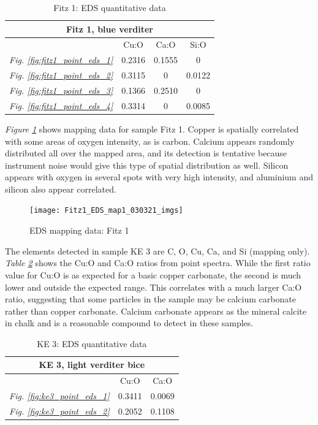 \begin{table}[H]
\caption{Fitz 1: EDS quantitative data}
\centering
\label{table:fitz1_ratios}
\begin{tabular}{c c c c}
\toprule
\multicolumn{4}{c}{Fitz 1, blue verditer} \\
\midrule
~ & Cu:O & Ca:O & Si:O \\
\midrule
\textit{Fig. \ref{fig:fitz1_point_eds_1}} & 0.2316 & 0.1555 & 0 \\
\textit{Fig. \ref{fig:fitz1_point_eds_2}} & 0.3115 & 0 & 0.0122 \\
\textit{Fig. \ref{fig:fitz1_point_eds_3}} & 0.1366 & 0.2510 & 0 \\
\textit{Fig. \ref{fig:fitz1_point_eds_4}} & 0.3314 & 0 & 0.0085 \\
\bottomrule
\end{tabular}
\end{table}

\textit{Figure \ref{fig:fitz1_map1}} shows mapping data for sample Fitz 1. Copper is spatially correlated with some areas of oxygen intensity, as is carbon. Calcium appears randomly distributed all over the mapped area, and its detection is tentative because instrument noise would give this type of spatial distribution as well. Silicon appears with oxygen in several spots with very high intensity, and aluminium and silicon also appear correlated.

\begin{figure}[H]
\centering
  \texttt{[image: Fitz1\_EDS\_map1\_030321\_imgs]}
\caption[EDS mapping data: Fitz 1]{EDS mapping data: Fitz 1}
\label{fig:fitz1_map1}
\end{figure}


The elements detected in sample KE 3 are C, O, Cu, Ca, and Si (mapping only). \textit{Table \ref{table:ke3_ratios}} shows the Cu:O and Ca:O ratios from point spectra. While the first ratio value for Cu:O is as expected for a basic copper carbonate, the second is much lower and outside the expected range. This correlates with a much larger Ca:O ratio, suggesting that some particles in the sample may be calcium carbonate rather than copper carbonate. Calcium carbonate appears as the mineral calcite in chalk and is a reasonable compound to detect in these samples.

\begin{table}[H]
\caption{KE 3: EDS quantitative data}
\centering
\label{table:ke3_ratios}
\begin{tabular}{c c c}
\toprule
\multicolumn{3}{c}{KE 3, light verditer bice} \\
\midrule
~ & Cu:O & Ca:O \\
\midrule
\textit{Fig. \ref{fig:ke3_point_eds_1}} & 0.3411 & 0.0069 \\
\textit{Fig. \ref{fig:ke3_point_eds_2}} & 0.2052 & 0.1108 \\
\bottomrule
\end{tabular}
\end{table}

